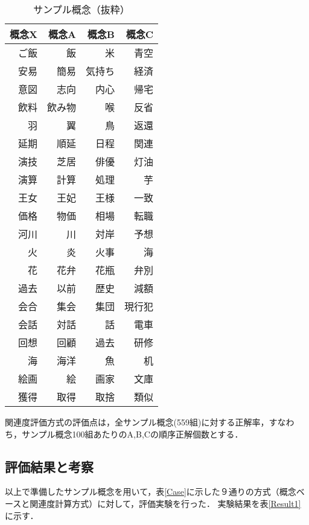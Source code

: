 \begin{table}[tb]
\caption[]{サンプル概念（抜粋）}
\begin{center}
\begin{tabular}{r|rrr} \hline
概念X & 概念A & 概念B & 概念C \\ \hline
ご飯&	飯&	    米&	    青空\\
安易&	簡易&	気持ち&	経済\\
意図&	志向&	内心&	帰宅\\
飲料&	飲み物&	喉&     反省\\
羽	&   翼&     鳥&     返還\\
延期&	順延&	日程&	関連\\
演技&	芝居&	俳優&	灯油\\
演算&	計算&	処理&	芋\\
王女&	王妃&	王様&	一致\\
価格&	物価&	相場&	転職\\
河川&	川  &	対岸&	予想\\
火	&   炎	&   火事&	海\\
花	&   花弁&   花瓶&	弁別\\
過去&	以前&	歴史&	減額\\
会合&	集会&	集団&	現行犯\\
会話&	対話&	話	&   電車\\
回想&	回顧&	過去&	研修\\
海	&   海洋&   魚	&   机\\
絵画&	絵	&   画家&   文庫\\
獲得&	取得&	取捨&	類似\\ \hline
\end{tabular}
\end{center}
\label{Sample}
\end{table}

関連度評価方式の評価点は，全サンプル概念(559組)に対する正解率，すなわち，サンプル概念100組あたりのA,B,Cの順序正解個数とする．


\subsection{評価結果と考察}

以上で準備したサンプル概念を用いて，表\ref{Case}に示した９通りの方式（概念ベースと関連度計算方式）に対して，評価実験を行った．
実験結果を表\ref{Result1}に示す．

